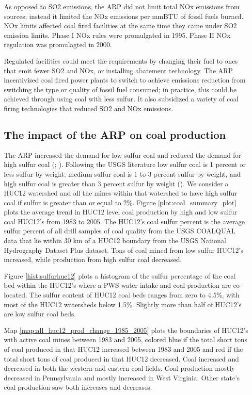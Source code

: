 \documentclass{article}
\begin{document}
As opposed to SO2 emissions, the ARP did not limit total NOx emissions from sources; instead it limited the NOx emissions per mmBTU of fossil fuels burned. NOx limits affected coal fired facilities at the same time they came under SO2 emission limits. Phase I NOx rules were promulgated in 1995. Phase II NOx regulation was promulagted in 2000.

Regulated facilities could meet the requirements by changing their fuel to ones that emit fewer SO2 and NOx, or installing abatement technology. The ARP incentivized coal fired power plants to switch to achieve emissions reduction from switching the type or quality of fossil fuel consumed; in practice, this could be achieved through using coal with less sulfur. It also subsidized a variety of coal firing technologies that reduced SO2 and NOx emissions.

\subsection{The impact of the ARP on coal production}

The ARP increased the demand for low sulfur coal and reduced the demand for high sulfur coal (\cite{epaarpcoalemp}; \cite{stratford2015coalprod}). Following the USGS literature low sulfur coal is 1 percent or less sulfur by weight, medium sulfur coal is 1 to 3 percent sulfur by weight, and high sulfur coal is greater than 3 percent sulfur by weight (\cite{schweinfurth2009introduction}). We consider a HUC12 watershed and all the mines within that watershed to have high sulfur coal if sulfur is greater than or equal to 2\%. Figure \ref{plot:coal_summary_plot} plots the average trend in HUC12 level coal production by high and low sulfur coal HUC12's from 1983 to 2005. The HUC12's coal sulfur percent is the average sulfur percent of all drill samples of coal quality from the USGS COALQUAL data that lie within 30 km of a HUC12 boundary from the USGS National Hydrography Dataset Plus dataset. Tons of coal mined from low sulfur HUC12's increased, while production from high sulfur coal decreased.

Figure \ref{hist:sulfurhuc12} plots a histogram of the sulfur percentage of the coal bed within the HUC12's where a PWS water intake and coal production are co-located. The sulfur content of HUC12 coal beds ranges from zero to 4.5\%, with most of the HUC12 watersheds below 1.5\%. Slightly more than half of HUC12's are low sulfur coal beds.

Map \ref{map:all_huc12_prod_change_1985_2005} plots the boundaries of HUC12's with active coal mines between 1983 and 2005, colored blue if the total short tons of coal produced in that HUC12 increased between 1983 and 2005 and red if the total short tons of coal produced in that HUC12 decreased. Coal increased and decreased in both the western and eastern coal fields. Coal production mostly decreased in Pennsylvania and mostly increased in West Virginia. Other state's coal production saw both increases and decreases.
\end{document}
